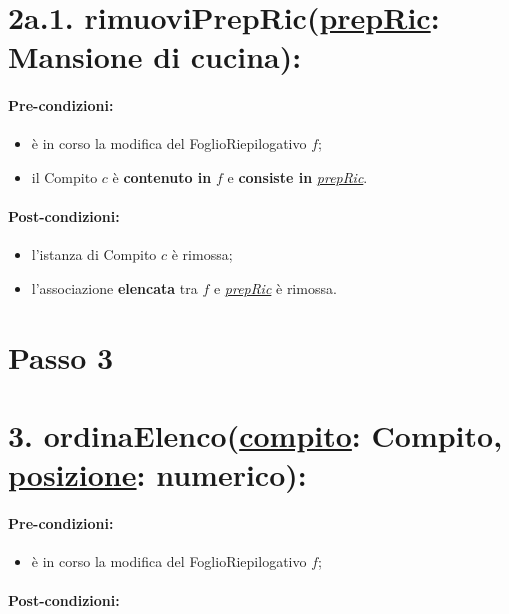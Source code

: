 \section*{2a.1. rimuoviPrepRic(\underline{prepRic}: Mansione di cucina):}

\paragraph{Pre-condizioni:}

\begin{itemize}
  \item è in corso la modifica del FoglioRiepilogativo $f$;
  \item il Compito $c$ è \textbf{contenuto in} $f$ e \textbf{consiste in} \underline{\textit{prepRic}}.    
\end{itemize}

\paragraph{Post-condizioni:}

\begin{itemize}
  \item l'istanza di Compito $c$ è rimossa;
  \item l'associazione \textbf{elencata} tra $f$ e \underline{\textit{prepRic}} è rimossa.
\end{itemize}

\section{Passo 3}

\section*{3. ordinaElenco(\underline{compito}: Compito, \underline{posizione}: numerico):}

\paragraph{Pre-condizioni:}

\begin{itemize}
  \item è in corso la modifica del FoglioRiepilogativo $f$;
\end{itemize}

\paragraph{Post-condizioni:}

